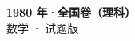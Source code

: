 \documentclass[zihao=-4, a4paper]{ctexart}
\begin{document}
\begin{center}
  {\Large\bfseries 1980 年·全国卷（理科）}\\[4pt]
  {\large 数学 · 试题版}
\end{center}
\medskip
{}

\end{document}
